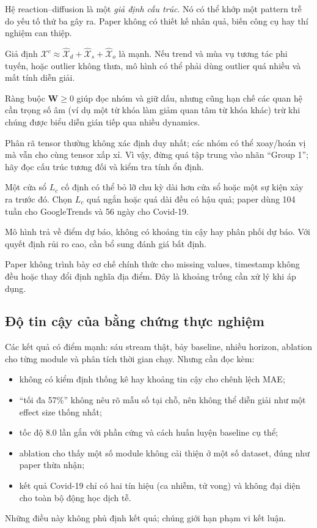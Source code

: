 \begin{description}[leftmargin=1.8em,style=nextline]
  \item[Diễn giải không phải nhân quả.] Hệ reaction--diffusion là một \emph{giả định cấu trúc}. Nó
  có thể khớp một pattern trễ do yếu tố thứ ba gây ra. Paper không có thiết kế nhân quả, biến công
  cụ hay thí nghiệm can thiệp.
  \item[Phép cộng ba thành phần.] Giả định $\mathcal{X}^{c}\approx\widehat{\mathcal{X}}_d+
  \widehat{\mathcal{X}}_s+\widehat{\mathcal{X}}_o$ là mạnh. Nếu trend và mùa vụ tương tác phi tuyến,
  hoặc outlier không thưa, mô hình
  có thể phải dùng outlier quá nhiều và mất tính diễn giải.
  \item[Hệ số không âm.] Ràng buộc $\mathbf{W}\ge0$ giúp đọc nhóm và giữ dấu, nhưng cũng hạn chế
  các quan hệ cần trọng số âm (ví dụ một từ khóa làm giảm quan tâm từ khóa khác) trừ khi chúng
  được biểu diễn gián tiếp qua nhiều dynamics.
  \item[Không duy nhất.] Phân rã tensor thường không xác định duy nhất; các nhóm có thể xoay/hoán vị
  mà vẫn cho cùng tensor xấp xỉ. Vì vậy, đừng quá tập trung vào nhãn ``Group 1''; hãy đọc cấu trúc
  tương đối và kiểm tra tính ổn định.
  \item[Cửa sổ cố định.] Một cửa sổ $L_c$ cố định có thể bỏ lỡ chu kỳ dài hơn cửa sổ hoặc một sự
  kiện xảy ra trước đó. Chọn $L_c$ quá ngắn hoặc quá dài đều có hậu quả; paper dùng 104 tuần cho
  GoogleTrends và 56 ngày cho Covid-19.
  \item[Không có bất định.] Mô hình trả về điểm dự báo, không có khoảng tin cậy hay phân phối dự báo.
  Với quyết định rủi ro cao, cần bổ sung đánh giá bất định.
  \item[Dữ liệu thiếu và không đều.] Paper không trình bày cơ chế chính thức cho missing values,
  timestamp không đều hoặc thay đổi định nghĩa địa điểm. Đây là khoảng trống cần xử lý khi áp dụng.
\end{description}

\subsection{Độ tin cậy của bằng chứng thực nghiệm}

Các kết quả có điểm mạnh: sáu stream thật, bảy baseline, nhiều horizon, ablation cho từng module và
phân tích thời gian chạy. Nhưng cần đọc kèm:
\begin{itemize}
  \item không có kiểm định thống kê hay khoảng tin cậy cho chênh lệch MAE;
  \item ``tối đa 57\%'' không nêu rõ mẫu số tại chỗ, nên không thể diễn giải như một effect size
        thống nhất;
  \item tốc độ 8.0 lần gắn với phần cứng và cách huấn luyện baseline cụ thể;
  \item ablation cho thấy một số module không cải thiện ở một số dataset, đúng như paper thừa nhận;
  \item kết quả Covid-19 chỉ có hai tín hiệu (ca nhiễm, tử vong) và không đại diện cho toàn bộ động
        học dịch tễ.
\end{itemize}
Những điều này không phủ định kết quả; chúng giới hạn phạm vi kết luận.

